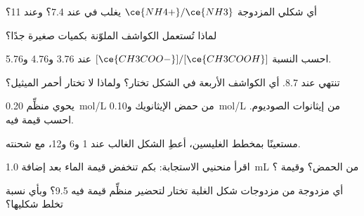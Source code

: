 \begin{exercise}[$\star$]\label{exo:g12:buffers-predominance:4}
أي شكلي المزدوجة $\ce{NH4+}/\ce{NH3}$ يغلب في  عند
 7.4؟ وعند  11؟
\end{exercise}

\begin{exercise}[$\star$]\label{exo:g12:buffers-predominance:5}
لماذا تُستعمل الكواشف الملوّنة بكميات صغيرة جدًا؟
\end{exercise}

\begin{exercise}[$\star\star$]\label{exo:g12:buffers-predominance:6}
احسب النسبة $[\ce{CH3COO-}]/[\ce{CH3COOH}]$ عند  3.76 و4.76
و5.76.
\end{exercise}

\begin{exercise}[$\star\star$]\label{exo:g12:buffers-predominance:7}
تنتهي  عند  8.7. أي الكواشف الأربعة في الشكل
تختار؟ ولماذا لا تختار أحمر الميثيل؟
\end{exercise}

\begin{exercise}[$\star\star$]\label{exo:g12:buffers-predominance:8}
يحوي  منظِّم \qty{0.20}{mol/L} من حمض الإيثانويك
و\qty{0.10}{mol/L} من إيثانوات الصوديوم. احسب قيمة  فيه.
\end{exercise}

\begin{exercise}[$\star\star$]\label{exo:g12:buffers-predominance:9}
مستعينًا بمخطط الغليسين، أعطِ الشكل الغالب عند  1 و6 و12،
مع شحنته.
\end{exercise}

\begin{exercise}[$\star\star$]\label{exo:g12:buffers-predominance:10}
اقرأ منحنيي الاستجابة: بكم تنخفض قيمة  الماء بعد
إضافة \qty{1.0}{mL} من الحمض؟ وقيمة  ؟
\end{exercise}

\begin{exercise}[$\star\star$]\label{exo:g12:buffers-predominance:11}
أي مزدوجة من مزدوجات شكل الغلبة تختار لتحضير
 منظِّم قيمة  فيه 9.5؟ وبأي نسبة تخلط شكليها؟
\end{exercise}

